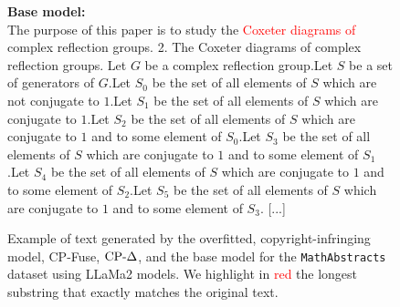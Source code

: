 \begin{figure}[!htbp]
\begin{mdframed}
\begin{minipage}[t]{\textwidth}
    \end{minipage}
    \begin{minipage}[t]{\textwidth}
        \textbf{Base model:} \\
    The purpose of this paper is to study the \textcolor{red}{Coxeter diagrams of} complex reflection groups. 2. The Coxeter diagrams of complex reflection groups. Let $G$ be a complex reflection group.Let $S$ be a set of generators of $G$.Let $S_0$ be the set of all elements of $S$ which are not conjugate to $1$.Let $S_1$ be the set of all elements of $S$ which are conjugate to $1$.Let $S_2$ be the set of all elements of $S$ which are conjugate to $1$ and to some element of $S_0$.Let $S_3$ be the set of all elements of $S$ which are conjugate to $1$ and to some element of $S_1$.Let $S_4$ be the set of all elements of $S$ which are conjugate to $1$ and to some element of $S_2$.Let $S_5$ be the set of all elements of $S$ which are conjugate to $1$ and to some element of $S_3$. [...]
    \end{minipage}
    \end{mdframed}
    \caption{Example of text generated by the overfitted, copyright-infringing model, CP-Fuse, $\text{CP-}\Delta$, and the base model for the \texttt{MathAbstracts} dataset using LLaMa2 models. We highlight in \textcolor{red}{red} the longest substring that exactly matches the original text.}
    \label{fig:example1_text_methods}
\end{figure}

